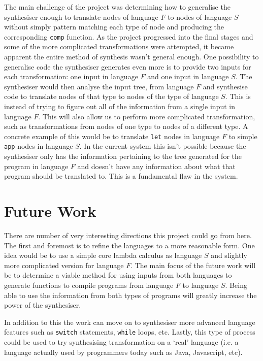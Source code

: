\documentclass[twoside]{article}
\begin{document}
The main challenge of the project was determining how to generalise
the synthesiser enough to translate nodes of language $F$ to nodes of
language $S$ without simply pattern matching each type of node and
producing the corresponding \texttt{comp} function. As the project
progressed into the final stages and some of the more complicated
transformations were attempted, it became apparent the entire method of
synthesis wasn't general enough. One possibility to generalise code
the synthesiser generates even more is to provide two inputs for each
transformation: one input in language $F$ and one input in language
$S$. The synthesiser would then analyse the input tree, from language
$F$ and synthesise code to translate nodes of that type to nodes of
the type of language $S$. This is instead of trying to figure out all
of the information from a single input in language $F$. This will also
allow us to perform more complicated transformation, such as
transformations from nodes of one type to nodes of a different type. A
concrete example of this would be to translate \texttt{let} nodes in
language $F$ to simple \texttt{app} nodes in language $S$. In the
current system this isn't possible because the synthesiser only has
the information pertaining to the tree generated for the program in
language $F$ and doesn't have any information about what that program
should be translated to. This is a fundamental flaw in the system.

\section{Future Work}
There are number of very interesting directions this project could go
from here. The first and foremost is to refine the languages to a more
reasonable form. One idea would be to use a simple core
lambda calculus as language $S$ and slightly more complicated version
for language $F$. The main focus of the future work will be to
determine a viable method for using inputs from both languages to
generate functions to compile programs from language $F$ to language
$S$. Being able to use the information from both types of programs
will greatly increase the power of the synthesiser.

In addition to this the work can move on to synthesiser more advanced
language features such as \texttt{switch} statements, \texttt{while}
loops, etc. Lastly, this type of process could be used to try
synthesising transformation on a `real' language (i.e. a language
actually used by programmers today such as Java, Javascript, etc).

{}

\end{document}
